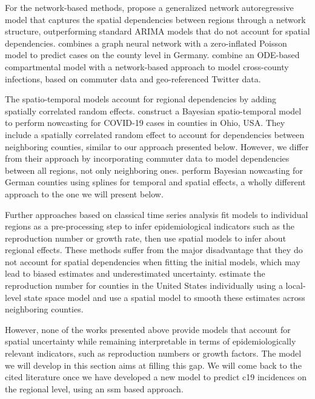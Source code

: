 For the network-based methods, \citep{Armbruster2024Networkbased} propose a generalized network autoregressive model that captures the spatial dependencies between regions through a network structure, outperforming standard ARIMA models that do not account for spatial dependencies. \citep{Fritz2022Combining} combines a graph neural network with a zero-inflated Poisson model to predict cases on the county level in Germany. \citep{Kuhn2021Assessmenta} combine an ODE-based compartmental model with a network-based approach to model cross-county infections, based on commuter data and geo-referenced Twitter data.

The spatio-temporal models account for regional dependencies by adding spatially correlated random effects. \citep{Kline2022Bayesian} construct a Bayesian spatio-temporal model to perform nowcasting for COVID-19 cases in counties in Ohio, USA. They include a spatially correlated random effect to account for dependencies between neighboring counties, similar to our approach presented below. However, we differ from their approach by incorporating commuter data to model dependencies between all regions, not only neighboring ones. \citep{DeNicola2022Regional,Schneble2021Nowcasting} perform Bayesian nowcasting for German counties using splines for temporal and spatial effects, a wholly different approach to the one we will present below.

Further approaches based on classical time series analysis fit models to individual regions as a pre-processing step to infer epidemiological indicators such as the reproduction number or growth rate, then use spatial models to infer about regional effects. These methods suffer from the major disadvantage that they do not account for spatial dependencies when fitting the initial models, which may lead to biased estimates and underestimated uncertainty. 
\citet{Ives2021Estimating} estimate the reproduction number for counties in the United States individually using a local-level state space model and use a spatial model to smooth these estimates across neighboring counties. 

However, none of the works presented above provide models that account for spatial uncertainty while remaining interpretable in terms of epidemiologically relevant indicators, such as reproduction numbers or growth factors. 
The model we will develop in this section aims at filling this gap. 
We will come back to the cited literature once we have developed a new model to predict \gls{c19} incidences on the regional level, using an \gls{ssm} based approach. 

